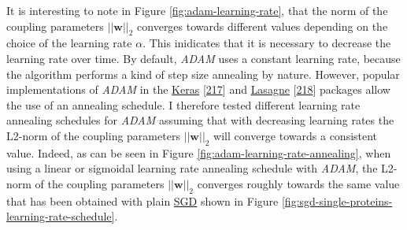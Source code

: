 \documentclass[11pt,a4paper,twoside]{book}
\newcommand{\w}{\mathbf{w}}
\theoremstyle{definition}
\theoremstyle{definition}
\theoremstyle{remark}
\begin{document}
It is interesting to note in Figure \ref{fig:adam-learning-rate}, that
the norm of the coupling parameters \(||\w||_2\) converges towards
different values depending on the choice of the learning rate
\(\alpha\). This inidicates that it is necessary to decrease the
learning rate over time. By default, \emph{ADAM} uses a constant
learning rate, because the algorithm performs a kind of step size
annealing by nature. However, popular implementations of \emph{ADAM} in
the
\href{https://github.com/fchollet/keras/blob/master/keras/optimizers.py\#L385}{Keras}
{[}\protect\hyperlink{ref-Chollet2015}{217}{]} and
\href{https://github.com/Lasagne/Lasagne/blob/master/lasagne/updates.py\#L565-L629}{Lasagne}
{[}\protect\hyperlink{ref-Dieleman2015}{218}{]} packages allow the use
of an annealing schedule. I therefore tested different learning rate
annealing schedules for \emph{ADAM} assuming that with decreasing
learning rates the L2-norm of the coupling parameters \(||\w||_2\) will
converge towards a consistent value. Indeed, as can be seen in Figure
\ref{fig:adam-learning-rate-annealing}, when using a linear or sigmoidal
learning rate annealing schedule with \emph{ADAM}, the L2-norm of the
coupling parameters \(||\w||_2\) converges roughly towards the same
value that has been obtained with plain \protect\hyperlink{abbrev}{SGD}
shown in Figure \ref{fig:sgd-single-proteins-learning-rate-schedule}.
\end{document}
